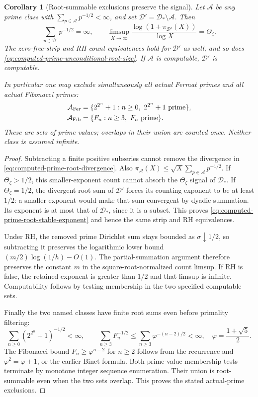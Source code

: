 \documentclass[11pt]{article}
\newtheorem{corollary}[theorem]{Corollary}
\theoremstyle{definition}
\begin{document}
\begin{corollary}[Root-summable exclusions preserve the signal]
\label{cor:computed-prime-root-summable-exclusions}
Let $\mathcal A$ be any prime class with
$\sum_{p\in\mathcal A}p^{-1/2}<\infty$, and set
$\mathcal D'=\mathcal D_*\setminus\mathcal A$.
Then
\begin{equation}
 \sum_{p\in\mathcal D'}p^{-1/2}=\infty,\qquad
 \limsup_{X\to\infty}
       \frac{\log(1+\pi_{\mathcal D'}(X))}{\log X}=\Theta_\zeta .
 \label{eq:computed-prime-root-stable-exponent}
\end{equation}
The zero-free-strip and RH count equivalences hold for
$\mathcal D'$ as well, and so does
\eqref{eq:computed-prime-unconditional-root-size}.
If $\mathcal A$ is computable, $\mathcal D'$ is computable.

In particular one may exclude simultaneously all actual
Fermat primes and all actual Fibonacci primes:
\[
 \begin{aligned}
 \mathcal A_{\rm Fer}
   &=\{2^{2^n}+1:n\ge0,\ 2^{2^n}+1\text{ prime}\},\\
 \mathcal A_{\rm Fib}
   &=\{F_n:n\ge3,\ F_n\text{ prime}\}.
 \end{aligned}
\]
These are sets of prime values; overlaps in their union
are counted once. Neither class is assumed infinite.
\end{corollary}

\begin{proof}
Subtracting a finite positive subseries cannot remove the
divergence in \eqref{eq:computed-prime-root-divergence}.
Also
$\pi_{\mathcal A}(X)\le
\sqrt X\sum_{p\in\mathcal A}p^{-1/2}$.
If $\Theta_\zeta>1/2$, this smaller-exponent count cannot
absorb the $\Theta_\zeta$ signal of $\mathcal D_*$.
If $\Theta_\zeta=1/2$, the divergent root sum of
$\mathcal D'$ forces its counting exponent to be at least
$1/2$: a smaller exponent would make that sum convergent
by dyadic summation. Its exponent is at most that of
$\mathcal D_*$, since it is a subset. This proves
\eqref{eq:computed-prime-root-stable-exponent} and hence
the same strip and RH equivalences.

Under RH, the removed prime Dirichlet sum stays bounded
as $\sigma\downarrow1/2$, so subtracting it preserves the
logarithmic lower bound $ (m/2)\log(1/h)-O(1)$.
The partial-summation argument therefore preserves the
constant $m$ in the square-root-normalized count limsup.
If RH is false, the retained exponent is greater than
$1/2$ and that limsup is infinite.
Computability follows by testing membership in the two
specified computable sets.

Finally the two named classes have finite root sums
even before primality filtering:
\[
 \sum_{n\ge0}(2^{2^n}+1)^{-1/2}<\infty,\qquad
 \sum_{n\ge3}F_n^{-1/2}
                  \le\sum_{n\ge3}\varphi^{-(n-2)/2}<\infty,
 \quad \varphi=\frac{1+\sqrt5}{2}.
\]
The Fibonacci bound $F_n\ge\varphi^{n-2}$ for $n\ge2$
follows from the recurrence and $\varphi^2=\varphi+1$,
or the earlier Binet formula. Both prime-value membership
tests terminate by monotone integer sequence enumeration.
Their union is root-summable even when the two sets overlap.
This proves the stated actual-prime exclusions.
\end{proof}
\end{document}

